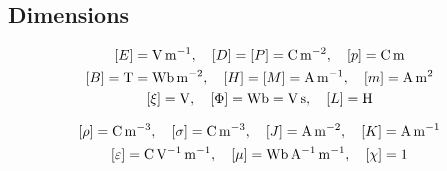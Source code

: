 \subsection{Dimensions}
\begin{align*}
\begin{gathered}
	\qty[E] = \si{\V \per\m} \qc \qty[D] = \qty[P] = \si{\coulomb \per\square\m} \qc \qty[p] = \si{\coulomb \m} \\
	\qty[B] = \si{\tesla} = \si{\weber \per\square\m} \qc \qty[H] = \qty[M] = \si{\A \per\m} \qc \qty[m] = \si{\A \square\m}\\
	\qty[\xi] = \si{\V} \qc \qty[\Phi] = \si{\weber} = \si{\V \s} \qc \qty[L] = \si{\henry} \\
\end{gathered}
\end{align*}

\begin{align*}
\begin{gathered}
	\qty[\rho] = \si{\coulomb \per\cubic\m} \qc \qty[\sigma] = \si{\coulomb \per\cubic\m} \qc \qty[J] = \si{\A \per\square\m} \qc \qty[K] = \si{\A \per\m} \\
	\qty[\varepsilon] = \si{\coulomb \per\V \per\m} \qc \qty[\mu] = \si{\weber \per\A \per\m } \qc \qty[\chi] = 1 \\
\end{gathered}
\end{align*}
